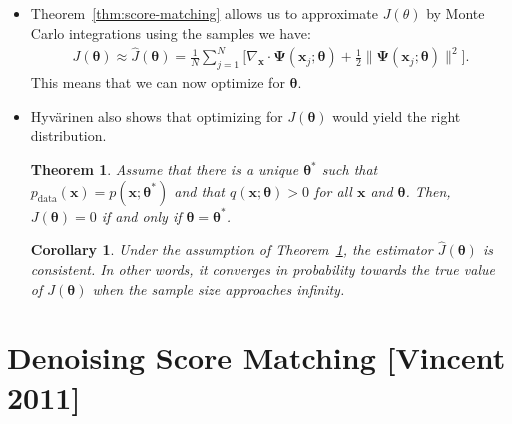 \documentclass[10pt]{article}
\newtheorem{theorem}[lemma]{Theorem}
\newtheorem{corollary}[lemma]{Corollary}
\newcommand{\ve}[1]{\mathbf{#1}}
\newcommand{\mrm}[1]{\mathrm{#1}}
\newcommand{\ves}[1]{\boldsymbol{#1}}
\begin{document}
\begin{itemize}
  \item Theorem~\ref{thm:score-matching} allows us to approximate $J(\theta)$ by Monte Carlo integrations using the samples we have:
  \begin{align} \label{eqn:score-matching}
      J(\ves{\theta}) \approx \widehat{J}(\ves{\theta}) 
      = \frac{1}{N} \sum_{j=1}^N \bigg[ \nabla_{\ve{x}} \cdot \ves{\Psi}(\ve{x}_j;\ves{\theta}) + \frac{1}{2} \| \ves{\Psi}(\ve{x}_j;\ves{\theta}) \|^2 \bigg].
  \end{align}
  This means that we can now optimize for $\ves{\theta}$.

  \item Hyv\"{a}rinen also shows that optimizing for $J(\ves{\theta})$ would yield the right distribution.
  
  \begin{theorem} \label{thm:score-matching-uniqueness}
    Assume that there is a unique $\ves{\theta}^*$ such that $p_{\mrm{data}}(\ve{x}) = p(\ve{x};\ves{\theta}^*)$ and that $q(\ve{x};\ves{\theta}) > 0$ for all $\ve{x}$ and $\ves{\theta}$. Then, $J(\ves{\theta}) = 0$ if and only if $\ves{\theta} = \ves{\theta}^*$.
  \end{theorem}

  \begin{corollary}
    Under the assumption of Theorem~\ref{thm:score-matching-uniqueness}, the estimator $\widehat{J}(\ves{\theta})$ is consistent. In other words, it converges in probability towards the true value of $J(\ves{\theta})$ when the sample size approaches infinity.
  \end{corollary}
\end{itemize}

\section{Denoising Score Matching [Vincent 2011]}
\end{document}
